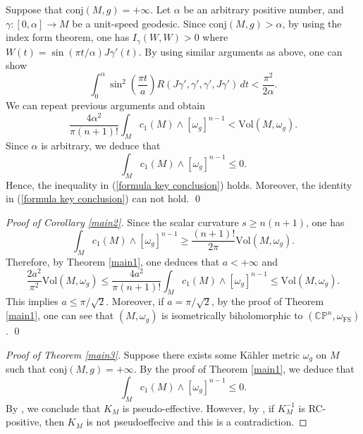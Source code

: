 \documentclass[12pt]{amsart}
\theoremstyle{plain}
\theoremstyle{definition}
\newcommand{\bproof}{\begin{proof}}
\newcommand{\eproof}{\end{proof}}
\newcommand{\beq}{\begin{equation}}
\newcommand{\eeq}{\end{equation}}
\renewcommand{\>}{\rightarrow}
\newcommand{\C}{{\mathbb C}}
\renewcommand{\P}{{\mathbb P}}
\newcommand{\om}{\omega}
\numberwithin{equation}{section} %
\begin{document}
	Suppose  that $\mathrm{conj}(M,g)=+\infty$. 	Let $\alpha$ be an arbitrary positive number,
	and $\gamma:[0,\alpha]\to M$ be a unit-speed geodesic. 
	Since $\mathrm{conj}(M,g)>\alpha$, by using the index form theorem, one has $I_\gamma(W,W)> 0$ where $W(t)=\sin(\pi t/\alpha)J\gamma'(t)$.
	By using similar arguments as above, one can show 
	\[
	\int_0^\alpha \sin^2\left(\frac{\pi t}{a}\right)R(J\gamma',\gamma',\gamma',J\gamma')\,dt< \frac{\pi^2}{2\alpha}.
	\]
	We can repeat previous arguments and obtain
	\[
	\frac{4\alpha^2}{\pi (n+1)!}\int_M c_1(M)\wedge [\omega_g]^{n-1} < \mathrm{Vol}(M,\omega_g).
	\]
	Since  $\alpha$ is arbitrary, we deduce that  \beq \int_M c_1(M)\wedge [\omega_g]^{n-1}\le 0.\eeq 
	Hence, the inequality in (\ref{formula key conclusion}) holds. Moreover, the identity in (\ref{formula key conclusion}) can not hold.
	\qed 
	
	\baselineskip
	\noindent \emph{Proof of Corollary \ref{main2}.}
	Since the scalar curvature $s\ge n(n+1)$, one has $$\int_M c_1(M)\wedge [\omega_g]^{n-1}\ge \frac{(n+1)!}{2\pi}\mathrm{Vol}(M,\om_g).$$
	Therefore, by Theorem \ref{main1}, one deduces that $a<+\infty$ and 
	\[
	\frac{2a^2}{\pi^2}\mathrm{Vol}(M,\om_g)\le \frac{4a^2}{\pi (n+1)!}\int_M c_1(M)\wedge [\omega_g]^{n-1} \le \mathrm{Vol}(M,\omega_g).
	\]
	This implies $a\le \pi/\sqrt{2}$.
	Moreover,  if $a=\pi/\sqrt{2}$, by the proof of Theorem \ref{main1}, one can see that $(M,\omega_g)$ is isometrically biholomorphic to $(\C\P^n,\om_{\mathrm{FS}})$.
	\qed
	
	
	
	 	\baselineskip
	
	\bproof[Proof of Theorem \ref{main3}]
	Suppose there exists some K\"ahler metric $\om_g$ on $M$ such that  $\mathrm{conj}(M,g)=+\infty$.
	By the proof of Theorem \ref{main1}, we deduce that $$\int_M c_1(M)\wedge [\omega_g]^{n-1} \le 0.$$ 
	By \cite[Theorem~1.1]{Yan19b}, we conclude that $K_M$ is pseudo-effective. However, by \cite[Theorem~1.5]{Yan19a}, if $K_M^{-1}$ is RC-positive, then $K_M$ is not pseudoeffecive and this is a contradiction.
	\eproof
	
	

	

\baselineskip
	
\end{document}

